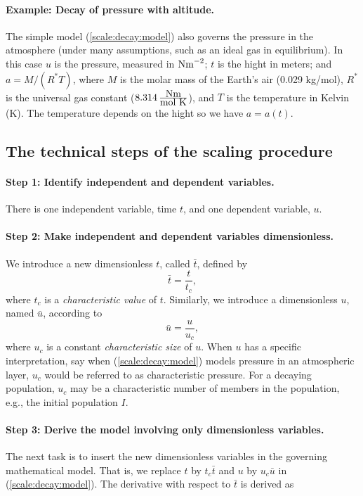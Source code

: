 \documentclass[graybox,envcountchap,sectrefs,final]{svmonodo}
\begin{document}
\paragraph{Example: Decay of pressure with altitude.}
The simple model (\ref{scale:decay:model}) also governs the pressure
in the atmosphere (under many assumptions, such as an ideal gas in
equilibrium). In this case $u$ is the
pressure, measured in $\hbox{Nm}^{-2}$; $t$ is the hight in meters;
and $a=M/(R^*T)$, where
$M$ is the molar mass of the Earth's air (0.029 kg/mol),
$R^*$ is the universal
gas constant ($8.314\,\frac{\hbox{Nm}}{\hbox{mol K}}$),
and $T$ is the temperature in Kelvin (K).
The temperature depends on the hight so we have $a=a(t)$.


\subsection{The technical steps of the scaling procedure}
\label{sec:scale:decay:steps}

\paragraph{Step 1: Identify independent and dependent variables.}
There is one independent variable, time $t$, and one dependent variable,
$u$.


\paragraph{Step 2: Make independent and dependent variables dimensionless.}
We introduce a new dimensionless $t$, called $\bar t$, defined by
\begin{equation}
\bar t = \frac{t}{t_c},
\end{equation}
where $t_c$ is a \emph{characteristic value} of $t$. Similarly,
we introduce a dimensionless $u$, named $\bar u$, according to
\begin{equation}
\bar u = \frac{u}{u_c},
\end{equation}
where $u_c$ is a constant \emph{characteristic size} of $u$. When $u$ has a specific
interpretation, say when (\ref{scale:decay:model}) models pressure
in an atmospheric layer, $u_c$ would be referred to as characteristic pressure.
For a decaying population, $u_c$ may be a characteristic number of
members in the population, e.g., the initial population $I$.

\paragraph{Step 3: Derive the model involving only dimensionless variables.}
The next task is to insert the new dimensionless variables in the
governing mathematical model. That is, we replace $t$ by $t_c\bar t$
and $u$ by $u_c\bar u$ in (\ref{scale:decay:model}). The derivative
with respect to $\bar t$ is derived as
\end{document}
